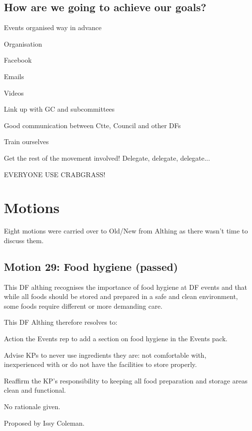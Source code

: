 \documentclass[a4paper, 12pt]{article}
\begin{document}
\subsection{How are we going to achieve our goals?}
\begin{itemize*}
	\item Events organised way in advance
	\item Organisation
	\item Facebook
	\item Emails
	\item Videos
	\item Link up with GC and subcommittees
	\item Good communication between Ctte, Council and other DFs
	\item Train ourselves
	\item Get the rest of the movement involved! Delegate, delegate, delegate...
	\item EVERYONE USE CRABGRASS!
\end{itemize*}

\section{Motions}
Eight motions were carried over to Old/New from Althing as there wasn't time to discuss them.
\subsection{Motion 29: Food hygiene (passed)}
This DF althing recognises the importance of food hygiene at DF events and that while all foods should be stored and prepared in a safe and clean environment, some foods require different or more demanding care.

This DF Althing therefore resolves to:
\begin{itemize*}
	\item Action the Events rep to add a section on food hygiene in the Events pack.
	\item Advise KPs to never use ingredients they are: not comfortable with, inexperienced with or do not have the facilities to store properly.
	\item Reaffirm the KP's responsibility to keeping all food preparation and storage areas clean and functional.
\end{itemize*}

No rationale given.

Proposed by Issy Coleman.
\end{document}
